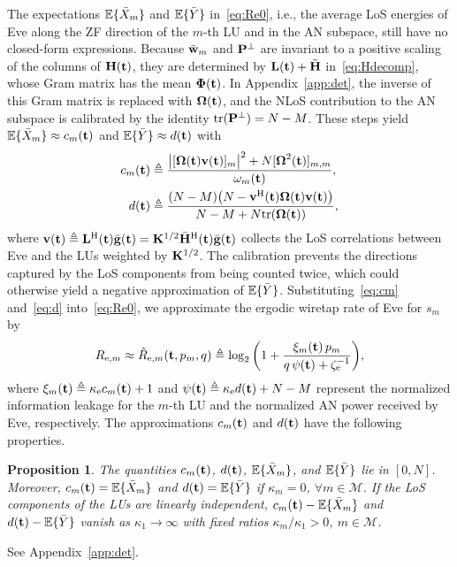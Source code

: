 \documentclass[journal]{IEEEtran}
\newtheorem{proposition}{Proposition}
\newcommand{\rev}[1]{{\color{red}#1}}
\newcommand{\rev}[1]{#1}
\begin{document}
The expectations $\mathbb{E}\{\bar X_m\}$ and $\mathbb{E}\{\bar Y\}$ in~\eqref{eq:Re0}, i.e., the average LoS energies of Eve along the ZF direction of the $m$-th LU and in the AN subspace, still have no closed-form expressions. Because $\bar{\mathbf{w}}_m$ and $\mathbf{P}^{\perp}$ are invariant to \rev{a positive} scaling of the columns of $\mathbf{H}(\mathbf{t})$, they are determined by $\mathbf{L}(\mathbf{t})+\tilde{\mathbf{H}}$ in~\eqref{eq:Hdecomp}, whose Gram matrix has the mean $\boldsymbol{\Phi}(\mathbf{t})$. In Appendix~\ref{app:det}, the inverse of this Gram matrix is replaced with $\boldsymbol{\Omega}(\mathbf{t})$, and the NLoS contribution to the AN subspace is calibrated by the identity $\mathrm{tr}(\mathbf{P}^{\perp})=N-M$. These steps yield $\mathbb{E}\{\bar X_m\}\approx c_m(\mathbf{t})$ and $\mathbb{E}\{\bar Y\}\approx d(\mathbf{t})$ with
\begin{align}
c_m(\mathbf{t})&\triangleq\frac{\big|[\boldsymbol{\Omega}(\mathbf{t})\mathbf{v}(\mathbf{t})]_m\big|^2+N[\boldsymbol{\Omega}^2(\mathbf{t})]_{m,m}}{\omega_m(\mathbf{t})},\label{eq:cm}\\
d(\mathbf{t})&\triangleq\frac{(N-M)\big(N-\mathbf{v}^{\mathrm H}(\mathbf{t})\boldsymbol{\Omega}(\mathbf{t})\mathbf{v}(\mathbf{t})\big)}{N-M+N\mathrm{tr}(\boldsymbol{\Omega}(\mathbf{t}))},\label{eq:d}
\end{align}
where $\mathbf{v}(\mathbf{t})\triangleq\mathbf{L}^{\mathrm H}(\mathbf{t})\bar{\mathbf{g}}(\mathbf{t})=\mathbf{K}^{1/2}\bar{\mathbf{H}}^{\mathrm H}(\mathbf{t})\bar{\mathbf{g}}(\mathbf{t})$ collects the LoS correlations between Eve and the LUs weighted by $\mathbf{K}^{1/2}$. The calibration prevents the directions captured by the LoS components from being counted twice, which could otherwise yield a negative approximation of $\mathbb{E}\{\bar Y\}$. Substituting~\eqref{eq:cm} and~\eqref{eq:d} into~\eqref{eq:Re0}, we approximate the ergodic wiretap rate of Eve for $s_m$ by
\begin{equation}\label{eq:Re}
R_{\mathrm{e},m}\approx\hat R_{\mathrm{e},m}(\mathbf{t},p_m,q)\triangleq\log_2\bigg(1+\frac{\xi_m(\mathbf{t})\,p_m}{q\,\psi(\mathbf{t})+\zeta_{\mathrm e}^{-1}}\bigg),
\end{equation}
where $\xi_m(\mathbf{t})\triangleq\kappa_{\mathrm e}c_m(\mathbf{t})+1$ and $\psi(\mathbf{t})\triangleq\kappa_{\mathrm e}d(\mathbf{t})+N-M$ represent the normalized information leakage for the $m$-th LU and the normalized AN power received by Eve, respectively. The approximations $c_m(\mathbf{t})$ and $d(\mathbf{t})$ have the following properties.

\begin{proposition}\label{prop:eve}
The quantities $c_m(\mathbf{t})$, $d(\mathbf{t})$, $\mathbb{E}\{\bar X_m\}$, and $\mathbb{E}\{\bar Y\}$ lie in $[0,N]$. Moreover, $c_m(\mathbf{t})=\mathbb{E}\{\bar X_m\}$ and $d(\mathbf{t})=\mathbb{E}\{\bar Y\}$ if $\kappa_m=0$, $\forall m\in\mathcal M$. If the LoS components of the LUs are linearly independent, $c_m(\mathbf{t})-\mathbb{E}\{\bar X_m\}$ and $d(\mathbf{t})-\mathbb{E}\{\bar Y\}$ vanish as $\kappa_1\to\infty$ with fixed ratios $\kappa_m/\kappa_1>0$, $m\in\mathcal M$.
\end{proposition}
\begin{IEEEproof}
See Appendix~\ref{app:det}.
\end{IEEEproof}
\end{document}
